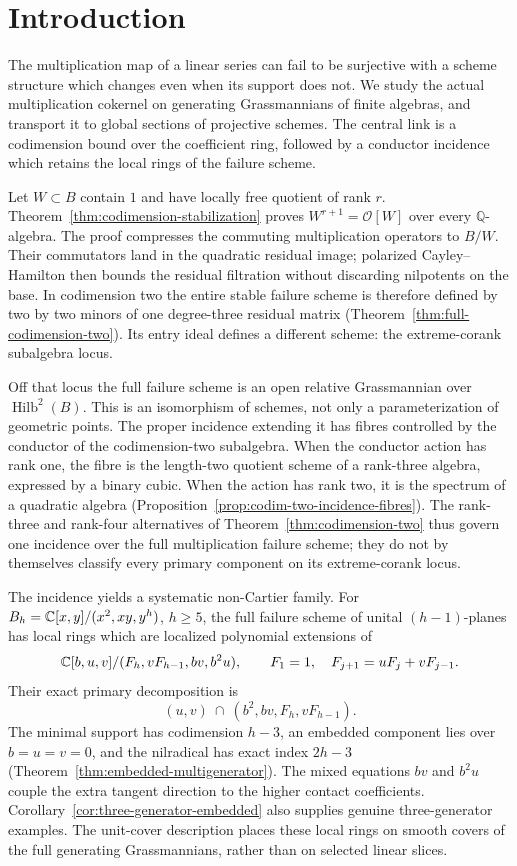 \section{Introduction}
\label{sec:conductor-introduction}
The multiplication map of a linear series can fail to be surjective
with a scheme structure which changes even when its support does not.
We study the actual multiplication cokernel on generating Grassmannians
of finite algebras, and transport it to global sections of projective
schemes. The central link is a codimension bound over the coefficient
ring, followed by a conductor incidence which retains the local rings
of the failure scheme.

Let $W\subset B$ contain $1$ and have locally free quotient of rank $r$.
Theorem~\ref{thm:codimension-stabilization} proves
$W^{r+1}=\mathcal O[W]$ over every $\mathbb Q$-algebra. The proof
compresses the commuting multiplication operators to $B/W$. Their
commutators land in the quadratic residual image; polarized
Cayley--Hamilton then bounds the residual filtration without discarding
nilpotents on the base. In codimension two the entire stable failure
scheme is therefore defined by two by two minors of one degree-three
residual matrix (Theorem~\ref{thm:full-codimension-two}). Its entry
ideal defines a different scheme: the extreme-corank subalgebra locus.

Off that locus the full failure scheme is an open relative
Grassmannian over $\operatorname{Hilb}^2(B)$. This is an isomorphism
of schemes, not only a parameterization of geometric points.
The proper incidence extending it has fibres controlled by the
conductor of the codimension-two subalgebra. When the conductor action
has rank one, the fibre is the length-two quotient scheme of a rank-three
algebra, expressed by a binary cubic. When the action has rank two,
it is the spectrum of a quadratic algebra
(Proposition~\ref{prop:codim-two-incidence-fibres}). The rank-three
and rank-four alternatives of Theorem~\ref{thm:codimension-two}
thus govern one incidence over the full multiplication failure scheme;
they do not by themselves classify every primary component on its
extreme-corank locus.

The incidence yields a systematic non-Cartier family. For
$B_h=\mathbb C[x,y]/(x^2,xy,y^h)$, $h\ge5$, the full failure scheme of
unital $(h-1)$-planes has local rings which are localized polynomial
extensions of
\[
 \mathbb C[b,u,v]/(F_h,vF_{h-1},bv,b^2u),
 \qquad F_1=1,\quad F_{j+1}=uF_j+vF_{j-1}.
\]
Their exact primary decomposition is
\[
 (u,v)\ \cap\ (b^2,bv,F_h,vF_{h-1}).
\]
The minimal support has codimension $h-3$, an embedded component
lies over $b=u=v=0$, and the nilradical has exact index $2h-3$
(Theorem~\ref{thm:embedded-multigenerator}). The mixed equations
$bv$ and $b^2u$ couple the extra tangent direction to the higher
contact coefficients. Corollary~\ref{cor:three-generator-embedded}
also supplies genuine three-generator examples. The unit-cover
description places these local rings on smooth covers of the full
generating Grassmannians, rather than on selected linear slices.

